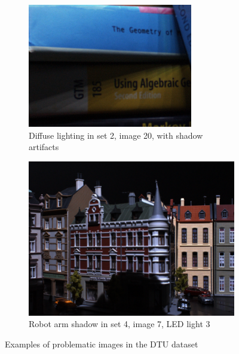 \documentclass[thesis.tex]{subfiles}
\begin{document}
\begin{figure}[tb]
	\centering
	\begin{subfigure}{0.49\textwidth}
		\includegraphics[width=\textwidth]{img/diffuse_light_problem.png}
		\caption{Diffuse lighting in set 2, image 20, with shadow artifacts}
		\label{fig:dtu_problems_diffuse}
	\end{subfigure}
	\begin{subfigure}{0.49\textwidth}
		\includegraphics[width=\textwidth]{img/robot_arm_shadow.png}
		\caption{Robot arm shadow in set 4, image 7, LED light 3}
		\label{fig:dtu_problems_robot}
	\end{subfigure}
	\caption{Examples of problematic images in the DTU dataset}
	\label{fig:dtu_problems}
\end{figure}
%
\end{document}
